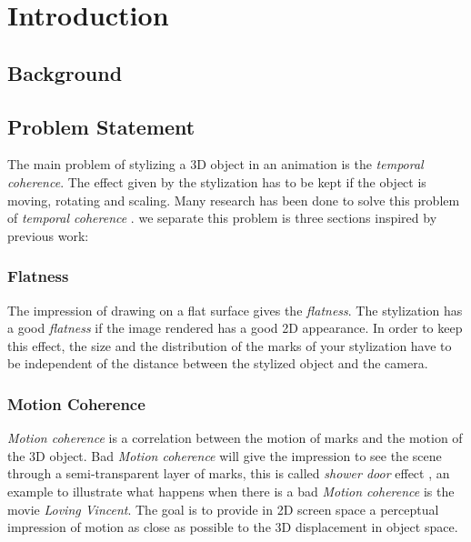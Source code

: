 \chapter{Introduction}


\section{Background}

\section{Problem Statement}

The main problem of stylizing a 3D object in an animation is the \textit{temporal coherence}. The effect given by the stylization has to be kept if the object is moving, rotating and scaling. Many research has been done to solve this problem of \textit{temporal coherence} \cite{vergne_implicit_2011, benard_dynamic_2009, bleron_motion-coherent_2018}. we separate this problem is three sections inspired by previous work\cite{meier_painterly_1996, cunzi_dynamic_nodate, breslav_dynamic_nodate}:

\subsection{Flatness}

The impression of drawing on a flat surface gives the \textit{flatness}. The stylization has a good \textit{flatness} if the image rendered has a good 2D appearance. In order to keep this effect, the size and the distribution of the marks of your stylization have to be independent of the distance between the stylized object and the camera.

\subsection{Motion Coherence}

\textit{Motion coherence} is a correlation between the motion of marks and the motion of the 3D object. Bad \textit{Motion coherence} will give the impression to see the scene through a semi-transparent layer of marks, this is called \textit{shower door} effect \cite{meier_painterly_1996}, an example to illustrate what happens when there is a bad \textit{Motion coherence} is the movie \textit{Loving Vincent}\cite{LovingVincent}. The goal is to provide in 2D screen space a perceptual impression of motion as
close as possible to the 3D displacement in object space.


